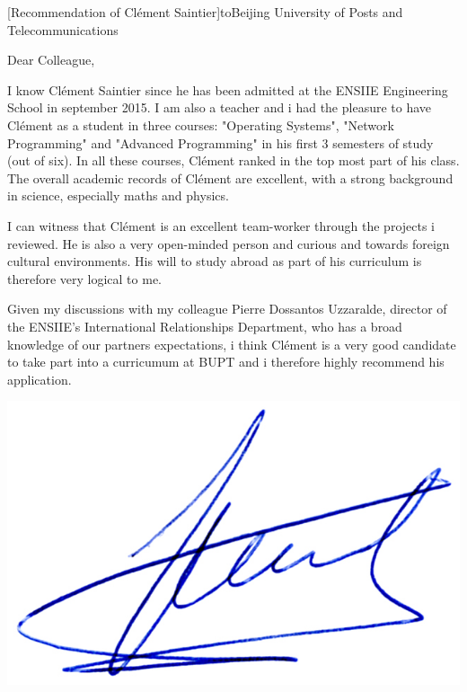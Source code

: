 \documentclass[a4paper,10pt]{article}
\begin{document}

\begin{letter}[Recommendation of Clément Saintier]{to}{Beijing University of
    Posts and Telecommunications}

Dear Colleague, 

I know  Clément Saintier since  he has been  admitted at the  ENSIIE Engineering
School in september  2015.  I am also a  teacher and i had the  pleasure to have
Clément  as   a  student  in   three  courses:  "Operating   Systems",  "Network
Programming" and "Advanced  Programming" in his first 3 semesters  of study (out
of six). In all these courses, Clément ranked in the top most part of his class.
The overall academic records of Clément  are excellent, with a strong background
in science, especially maths and physics.


I can  witness that Clément is  an excellent team-worker through  the projects i
reviewed. He is  also a very open-minded person and  curious and towards foreign
cultural environments.  His will to  study abroad as  part of his  curriculum is
therefore very logical to me.


Given my discussions with my colleague Pierre Dossantos Uzzaralde, director of
the ENSIIE's International Relationships Department, who has a broad knowledge
of our partners expectations, i think Clément is a very good candidate to take
part into a curricumum at BUPT and i therefore highly recommend his application.

\end{letter}
\begin{flushright}
\includegraphics[width=.26\textwidth]{signgenaud.jpg}
\end{flushright}
%
%
\end{document}
